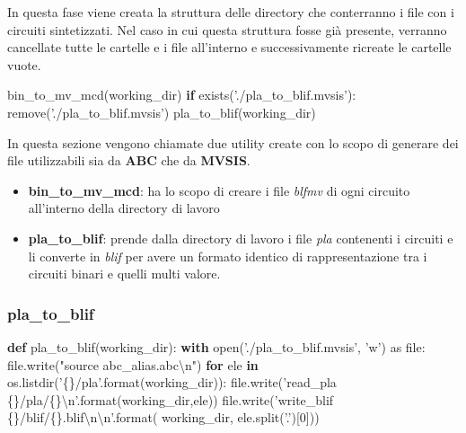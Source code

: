 \documentclass[]{book}
\newenvironment{Shaded}{\begin{snugshade}}{\end{snugshade}}
\newcommand{\BuiltInTok}[1]{#1}
\newcommand{\CharTok}[1]{\textcolor[rgb]{0.31,0.60,0.02}{#1}}
\newcommand{\ControlFlowTok}[1]{\textcolor[rgb]{0.13,0.29,0.53}{\textbf{#1}}}
\newcommand{\DecValTok}[1]{\textcolor[rgb]{0.00,0.00,0.81}{#1}}
\newcommand{\ImportTok}[1]{#1}
\newcommand{\KeywordTok}[1]{\textcolor[rgb]{0.13,0.29,0.53}{\textbf{#1}}}
\newcommand{\NormalTok}[1]{#1}
\newcommand{\SpecialCharTok}[1]{\textcolor[rgb]{0.00,0.00,0.00}{#1}}
\newcommand{\StringTok}[1]{\textcolor[rgb]{0.31,0.60,0.02}{#1}}
\providecommand{\tightlist}{%
  \setlength{\itemsep}{0pt}\setlength{\parskip}{0pt}}
\begin{document}
In questa fase viene creata la struttura delle directory che conterranno i file con i circuiti sintetizzati. Nel caso in cui questa struttura fosse già presente, verranno cancellate tutte le cartelle e i file all'interno e successivamente ricreate le cartelle vuote.

\begin{Shaded}
\begin{Highlighting}[]
\NormalTok{bin_to_mv_mcd(working_dir)}
\ControlFlowTok{if}\NormalTok{ exists(}\StringTok{'./pla_to_blif.mvsis'}\NormalTok{):}
\NormalTok{  remove(}\StringTok{'./pla_to_blif.mvsis'}\NormalTok{)}
\NormalTok{pla_to_blif(working_dir)}
\end{Highlighting}
\end{Shaded}

\newpage

In questa sezione vengono chiamate due utility create con lo scopo di generare dei file utilizzabili sia da \textbf{ABC} che da \textbf{MVSIS}.

\begin{itemize}
\tightlist
\item
  \textbf{bin\_to\_mv\_mcd}: ha lo scopo di creare i file \emph{blfmv} di ogni circuito all'interno della directory di lavoro
\item
  \textbf{pla\_to\_blif}: prende dalla directory di lavoro i file \emph{pla} contenenti i circuiti e li converte in \emph{blif} per avere un formato identico di rappresentazione tra i circuiti binari e quelli multi valore.
\end{itemize}

\newpage

\hypertarget{pla_to_blif}{%
\subsubsection{pla\_to\_blif}\label{pla_to_blif}}

\begin{Shaded}
\begin{Highlighting}[]
\KeywordTok{def}\NormalTok{ pla_to_blif(working_dir):}
  \ControlFlowTok{with} \BuiltInTok{open}\NormalTok{(}\StringTok{'./pla_to_blif.mvsis'}\NormalTok{, }\StringTok{'w'}\NormalTok{) }\ImportTok{as} \BuiltInTok{file}\NormalTok{:}
    \BuiltInTok{file}\NormalTok{.write(}\StringTok{"source abc_alias.abc}\CharTok{\textbackslash{}n}\StringTok{"}\NormalTok{)}
    \ControlFlowTok{for}\NormalTok{ ele }\KeywordTok{in}\NormalTok{ os.listdir(}\StringTok{'}\SpecialCharTok{\{\}}\StringTok{/pla'}\NormalTok{.}\BuiltInTok{format}\NormalTok{(working_dir)):}
      \BuiltInTok{file}\NormalTok{.write(}\StringTok{'read_pla }\SpecialCharTok{\{\}}\StringTok{/pla/}\SpecialCharTok{\{\}}\CharTok{\textbackslash{}n}\StringTok{'}\NormalTok{.}\BuiltInTok{format}\NormalTok{(working_dir,ele))}
      \BuiltInTok{file}\NormalTok{.write(}\StringTok{'write_blif }\SpecialCharTok{\{\}}\StringTok{/blif/}\SpecialCharTok{\{\}}\StringTok{.blif}\CharTok{\textbackslash{}n\textbackslash{}n}\StringTok{'}\NormalTok{.}\BuiltInTok{format}\NormalTok{(}
\NormalTok{        working_dir, ele.split(}\StringTok{'.'}\NormalTok{)[}\DecValTok{0}\NormalTok{]))}
\end{Highlighting}
\end{Shaded}
\end{document}
